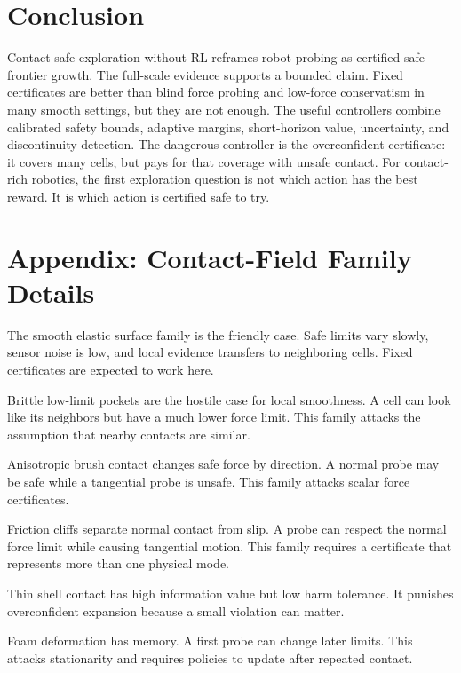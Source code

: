 \documentclass{article}
\begin{document}
\section{Conclusion}

Contact-safe exploration without RL reframes robot probing as certified safe
frontier growth. The full-scale evidence supports a bounded claim. Fixed
certificates are better than blind force probing and low-force conservatism in
many smooth settings, but they are not enough. The useful controllers combine
calibrated safety bounds, adaptive margins, short-horizon value, uncertainty,
and discontinuity detection. The dangerous controller is the overconfident
certificate: it covers many cells, but pays for that coverage with unsafe
contact. For contact-rich robotics, the first exploration question is not
which action has the best reward. It is which action is certified safe to try.

\appendix
\setcounter{section}{0}
\renewcommand{\thesection}{A.\arabic{section}}

\section{Appendix: Contact-Field Family Details}

The smooth elastic surface family is the friendly case. Safe limits vary
slowly, sensor noise is low, and local evidence transfers to neighboring
cells. Fixed certificates are expected to work here.

Brittle low-limit pockets are the hostile case for local smoothness. A cell can
look like its neighbors but have a much lower force limit. This family attacks
the assumption that nearby contacts are similar.

Anisotropic brush contact changes safe force by direction. A normal probe may
be safe while a tangential probe is unsafe. This family attacks scalar force
certificates.

Friction cliffs separate normal contact from slip. A probe can respect the
normal force limit while causing tangential motion. This family requires a
certificate that represents more than one physical mode.

Thin shell contact has high information value but low harm tolerance. It
punishes overconfident expansion because a small violation can matter.

Foam deformation has memory. A first probe can change later limits. This
attacks stationarity and requires policies to update after repeated contact.
\end{document}
